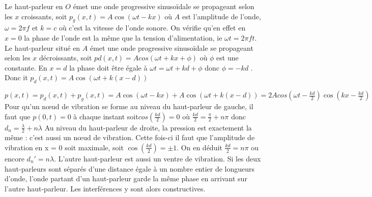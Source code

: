 \begin{Answer}
  \Question
  Le haut-parleur en $O$ émet une onde progressive sinusoïdale se
propageant selon les $x$ croissants, soit $p_g (x, t) = A\cos(\omega t - kx)$ où $A$
est l’amplitude de l’onde, $\omega = 2\pi f$ et $k = c$ où c’est la vitesse de
l’onde sonore. On vérifie qu’en effet en $x = 0$ la phase de l’onde est la
même que la tension d’alimentation, ie $\omega t = 2\pi ft$.
  \Question Le haut-parleur situé en $A$ émet une onde progressive sinusoïdale se
propageant selon les $x$ décroissants, soit  $p d (x, t) = A cos(\omega t + kx +
\phi)$ où $\phi$ est une constante. En $x = d$ la phase doit être égale à $\omega t =
\omega t + kd + \phi$ donc $\phi = -kd$ . Donc it $p_d(x, t) = A\cos(\omega t + k(x -
d))$

\Question $p(x,t) = p_d(x, t) + p_g(x, t) = A\cos(\omega t - kx) + A\cos(\omega t + k(x - d)) = 2Acos (\omega t-\frac{kd}{2})\cos(kx - \frac{kd}{2})$
Pour qu’un nœud de vibration se forme au niveau du haut-parleur de  gauche, il faut que $p(0, t) = 0$ à chaque instant soit$ cos (\frac{kd}{2}) = 0$ où $\frac{kd}{2}= \frac{\pi}{2}+n\pi$ donc $d_n=\frac{\lambda}{2}+n\lambda$
\Question Au niveau du haut-parleur de droite, la pression est exactement la
même : c’est aussi un nœud de vibration.
\Question Cette fois-ci il faut que l’amplitude de vibration en x = 0 soit maximale, soit $\cos(\frac{kd}{2})=\pm 1$. On en déduit $\frac{kd}{2} = n\pi$ ou encore $d_n'=n\lambda$. L’autre haut-parleur est aussi un ventre de vibration. Si les deux haut-parleurs sont séparés d’une distance égale à un nombre entier de longueurs d’onde, l’onde partant d’un haut-parleur garde la même phase
en arrivant sur l’autre haut-parleur. Les interférences y sont alors
constructives.



\end{Answer}
